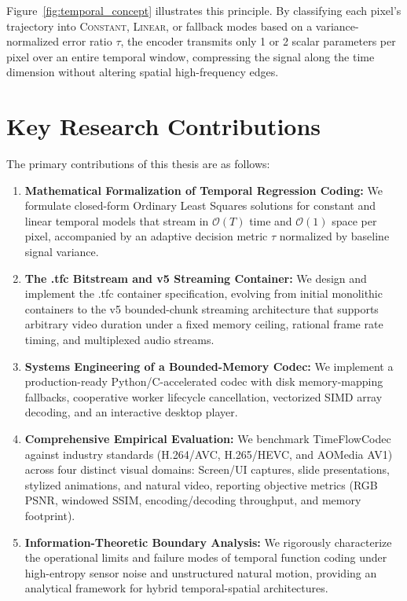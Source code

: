 Figure~\ref{fig:temporal_concept} illustrates this principle. By classifying each pixel's trajectory into \textsc{Constant}, \textsc{Linear}, or fallback modes based on a variance-normalized error ratio $\tau$, the encoder transmits only 1 or 2 scalar parameters per pixel over an entire temporal window, compressing the signal along the time dimension without altering spatial high-frequency edges.

\section{Key Research Contributions}
The primary contributions of this thesis are as follows:
\begin{enumerate}
    \item \textbf{Mathematical Formalization of Temporal Regression Coding:} We formulate closed-form Ordinary Least Squares solutions for constant and linear temporal models that stream in $\mathcal{O}(T)$ time and $\mathcal{O}(1)$ space per pixel, accompanied by an adaptive decision metric $\tau$ normalized by baseline signal variance.
    \item \textbf{The .tfc Bitstream and v5 Streaming Container:} We design and implement the .tfc container specification, evolving from initial monolithic containers to the v5 bounded-chunk streaming architecture that supports arbitrary video duration under a fixed memory ceiling, rational frame rate timing, and multiplexed audio streams.
    \item \textbf{Systems Engineering of a Bounded-Memory Codec:} We implement a production-ready Python/C-accelerated codec with disk memory-mapping fallbacks, cooperative worker lifecycle cancellation, vectorized SIMD array decoding, and an interactive desktop player.
    \item \textbf{Comprehensive Empirical Evaluation:} We benchmark TimeFlowCodec against industry standards (H.264/AVC, H.265/HEVC, and AOMedia AV1) across four distinct visual domains: Screen/UI captures, slide presentations, stylized animations, and natural video, reporting objective metrics (RGB PSNR, windowed SSIM, encoding/decoding throughput, and memory footprint).
    \item \textbf{Information-Theoretic Boundary Analysis:} We rigorously characterize the operational limits and failure modes of temporal function coding under high-entropy sensor noise and unstructured natural motion, providing an analytical framework for hybrid temporal-spatial architectures.
\end{enumerate}

